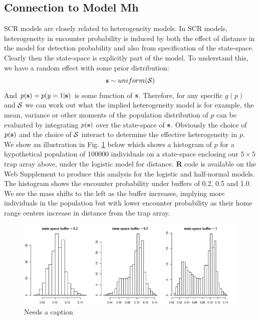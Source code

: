 \subsection{Connection to Model Mh}  \label{scr0.sec.scrmh}

SCR models are closely related to heterogeneity models. In SCR models,
heterogeneity in encounter probability is induced by both the effect
of distance in the model for detection probability and also from
specification of the state-space. Clearly then the state-space is
explicitly part of the model. To understand this, we have a random
effect with some prior distribution:
\[
{\bf s} \sim uniform({\cal S})
\]
And $p({\bf s}) = p(y=1|{\bf s})$ is some function of ${\bf
  s}$. Therefore, for any specific $g(p)$ and ${\cal S}$ we can work
out what the implied heterogeneity model is for example, the mean,
variance or other moments of the population distribution of $p$ can be
evaluated by integrating $p({\bf s})$ over the state-space of ${\bf
  s}$.  Obviously the choice of $p({\bf s})$ and the choice of ${\cal
  S}$ interact to determine the effective heterogeneity in $p$. We
show an illustration in Fig. \ref{scr0.fig.buffereffect} below which
shows a histogram of $p$ for a hypothetical population of 100000
individuals on a state-space enclosing our $5 \times 5$ trap array
above, under the logistic model for distance. {\bf R} code is
available on the Web Supplement to produce this analysis for the
logistic and half-normal models. The histogram shows the encounter
probability under buffers of 0.2, 0.5 and 1.0. We see the mass shifts
to the left as the buffer increases, implying more individuals in the
population but with lower encounter probability as their home range
centers increase in distance from the trap array.


\begin{figure}
\begin{center}
\includegraphics[width=5in]{figs/buffereffect}
\end{center}
\caption{Needs a caption}
\label{scr0.fig.buffereffect}
\end{figure}

